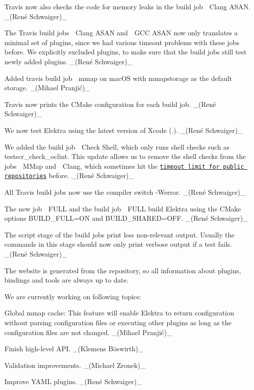 \begin{DoxyItemize}
\item Travis now also checks the code for memory leaks in the build job {\ttfamily 🍏 Clang A\+S\+AN}. \+\_\+(René Schwaiger)\+\_\+
\item The Travis build jobs {\ttfamily 🍏 Clang A\+S\+AN} and {\ttfamily 🐧 G\+CC A\+S\+AN} now only translates a minimal set of plugins, since we had various timeout problems with these jobs before. We explicitly excluded plugins, to make sure that the build jobs still test newly added plugins. \+\_\+(René Schwaiger)\+\_\+
\item Added travis build job {\ttfamily 🍏 mmap} on mac\+OS with {\ttfamily mmapstorage} as the default storage. \+\_\+(Mihael Pranjić)\+\_\+
\item Travis now prints the C\+Make configuration for each build job. \+\_\+(René Schwaiger)\+\_\+
\item We now test Elektra using the latest version of Xcode ({.}). \+\_\+(René Schwaiger)\+\_\+
\item We added the build job {\ttfamily 🍏 Check Shell}, which only runs shell checks such as {\ttfamily testscr\+\_\+check\+\_\+oclint}. This update allows us to remove the shell checks from the jobs {\ttfamily 🍏 M\+Map} and {\ttfamily 🍏 Clang}, which sometimes hit the \href{https://docs.travis-ci.com/user/customizing-the-build#build-timeouts}{\tt timeout limit for public repositories} before. \+\_\+(René Schwaiger)\+\_\+
\item All Travis build jobs now use the compiler switch {\ttfamily -\/\+Werror}. \+\_\+(René Schwaiger)\+\_\+
\item The new job {\ttfamily 🍏 F\+U\+LL} and the build job {\ttfamily 🐧 F\+U\+LL} build Elektra using the C\+Make options {\ttfamily B\+U\+I\+L\+D\+\_\+\+F\+U\+LL=ON} and {\ttfamily B\+U\+I\+L\+D\+\_\+\+S\+H\+A\+R\+ED=O\+FF}. \+\_\+(René Schwaiger)\+\_\+
\item The {\ttfamily script} stage of the build jobs print less non-\/relevant output. Usually the commands in this stage should now only print verbose output if a test fails. \+\_\+(René Schwaiger)\+\_\+
\end{DoxyItemize}

The website is generated from the repository, so all information about plugins, bindings and tools are always up to date.

We are currently working on following topics\+:


\begin{DoxyItemize}
\item Global mmap cache\+: This feature will enable Elektra to return configuration without parsing configuration files or executing other plugins as long as the configuration files are not changed. \+\_\+(Mihael Pranjić)\+\_\+
\item Finish high-\/level A\+PI. \+\_\+(Klemens Böswirth)\+\_\+
\item Validation improvements. \+\_\+(\+Michael Zronek)\+\_\+
\item Improve Y\+A\+ML plugins. \+\_\+(René Schwaiger)\+\_\+
\end{DoxyItemize}

